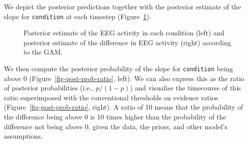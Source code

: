 \documentclass[
  doc,
  floatsintext,
  longtable,
  a4paper,
  nolmodern,
  notxfonts,
  notimes,
  colorlinks=true,linkcolor=blue,citecolor=blue,urlcolor=blue]{apa7}
\begin{document}
We depict the posterior predictions together with the posterior estimate
of the slope for \texttt{condition} at each timestep
(Figure~\ref{fig-plot-post-slope}).

\begin{figure}[!htb]

\caption{\label{fig-plot-post-slope}Posterior estimate of the EEG
activity in each condition (left) and posterior estimate of the
difference in EEG activity (right) according to the GAM.}


\end{figure}%

We then compute the posterior probability of the slope for
\texttt{condition} being above \(0\) (Figure~\ref{fig-post-prob-ratio},
left). We can also express this as the ratio of posterior probabilities
(i.e., \(p/(1-p)\)) and visualise the timecourse of this ratio
superimposed with the conventional thresholds on evidence ratios
(Figure~\ref{fig-post-prob-ratio}, right). A ratio of 10 means that the
probability of the difference being above 0 is 10 times higher than the
probability of the difference not being above 0, given the data, the
priors, and other model's assumptions.
\end{document}
